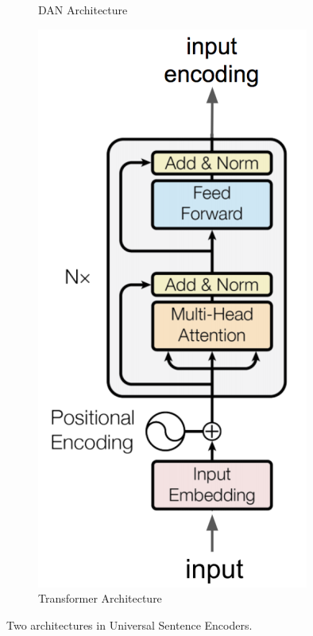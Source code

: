 \begin{figure}
\begin{subfigure}[b]{.35\textwidth}
		\caption{DAN Architecture}
		\label{fig:dan}
	\end{subfigure}%
	\begin{subfigure}[b]{.35\textwidth}
		\centering
		\includegraphics[width=\textwidth]{figures/semantic_textual_similarity/sentence_encoders/transformer.png}
		\caption{Transformer Architecture}
		\label{fig:transformer}
	\end{subfigure}
	\caption[Universal Sentence Encoder Architectures]{Two architectures in Universal Sentence Encoders.}
	\label{fig:use}
\end{figure}

